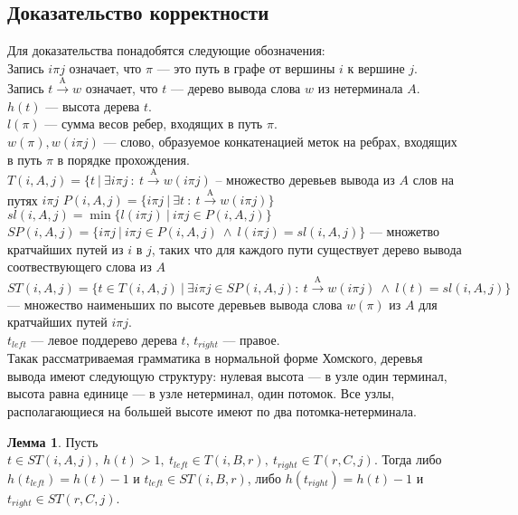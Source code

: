 \documentclass[14pt]{matmex-diploma}
\theoremstyle{definition}
\newtheorem{lemma}{Лемма}
\newcommand{\overtext}[2]{\ensuremath{\stackrel{\mathrm{#1}}{\mathrm{#2}}}}
\begin{document}
    \subsection{Доказательство корректности}
        Для доказательства понадобятся следующие обозначения:\\
        Запись $i\pi j$ означает, что $\pi$ --- это путь в графе от вершины $i$ к вершине $j$.\\
        Запись $t \overtext{A}{\rightarrow} w$ означает, что $t$ --- дерево вывода слова $w$ из нетерминала $A$.\\ 
        $h(t)$ --- высота дерева $t$.\\
        $l(\pi)$ --- сумма весов ребер, входящих в путь $\pi$.\\
        $w(\pi), w(i\pi j)$ --- слово, образуемое конкатенацией меток на ребрах, входящих в путь $\pi$ в порядке прохождения.\\
        $T(i,A,j) = \{t~|~\exists i\pi j~:~t\overtext{A}{\rightarrow}w(i\pi j)$ -- множество деревьев вывода из $A$ слов на путях $i\pi j$
        $P(i,A,j) = \{i\pi j~|~\exists t~:~t\overtext{A}{\rightarrow}w(i\pi j)\}$\\
        $sl(i,A,j) = \min\{l(i\pi j)~|~i\pi j \in P(i,A,j)\}$\\
        $SP(i,A,j) = \{i\pi j~|~i\pi j \in P(i,A,j)~\land~l(i\pi j) = sl(i,A,j)\}$ --- множетво кратчайших путей из $i$ в $j$, таких что для каждого пути существует дерево вывода соотвествующего слова из $A$\\
        $ST(i,A,j) = \{t\in T(i,A,j)~|~\exists i\pi j\in SP(i,A,j): ~t\overtext{A}{\rightarrow}w(i\pi j)~\land~l(t) = sl(i,A,j)\}$ --- множество наименьших по высоте деревьев вывода слова $w(\pi)$ из $A$ для кратчайших путей $i\pi j$.\\
        $t_{left}$ --- левое поддерево дерева $t$, $t_{right}$ --- правое.\\
        Такак рассматриваемая грамматика в нормальной форме Хомского, деревья вывода имеют следующую структуру: нулевая высота --- в узле один терминал, высота равна единице --- в узле нетерминал, один потомок. Все узлы, располагающиеся на большей высоте имеют по два потомка-нетерминала.
        \begin{lemma}
        \label{sequence}
        Пусть $t \in ST(i,A,j),~h(t) > 1,~t_{left} \in T(i,B,r),~t_{right} \in T(r,C,j)$. Тогда либо $h(t_{left}) = h(t)-1$ и $t_{left} \in ST(i,B,r)$, либо $h(t_{right}) = h(t)-1$ и $t_{right} \in ST(r,C,j)$.
             
        \end{lemma}
\end{document}
